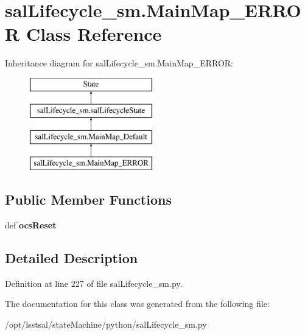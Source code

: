 \hypertarget{classsal_lifecycle__sm_1_1_main_map___e_r_r_o_r}{\section{sal\-Lifecycle\-\_\-sm.\-Main\-Map\-\_\-\-E\-R\-R\-O\-R Class Reference}
\label{classsal_lifecycle__sm_1_1_main_map___e_r_r_o_r}
}
Inheritance diagram for sal\-Lifecycle\-\_\-sm.\-Main\-Map\-\_\-\-E\-R\-R\-O\-R\-:\begin{figure}[H]
\begin{center}
\leavevmode
\includegraphics[height=4.000000cm]{classsal_lifecycle__sm_1_1_main_map___e_r_r_o_r}
\end{center}
\end{figure}
\subsection*{Public Member Functions}
\begin{DoxyCompactItemize}
\item 
\hypertarget{classsal_lifecycle__sm_1_1_main_map___e_r_r_o_r_aa63440a6eb00f1324bb1095b03b22df1}{def {\bfseries ocs\-Reset}}\label{classsal_lifecycle__sm_1_1_main_map___e_r_r_o_r_aa63440a6eb00f1324bb1095b03b22df1}

\end{DoxyCompactItemize}


\subsection{Detailed Description}


Definition at line 227 of file sal\-Lifecycle\-\_\-sm.\-py.



The documentation for this class was generated from the following file\-:\begin{DoxyCompactItemize}
\item 
/opt/lsstsal/state\-Machine/python/sal\-Lifecycle\-\_\-sm.\-py\end{DoxyCompactItemize}
